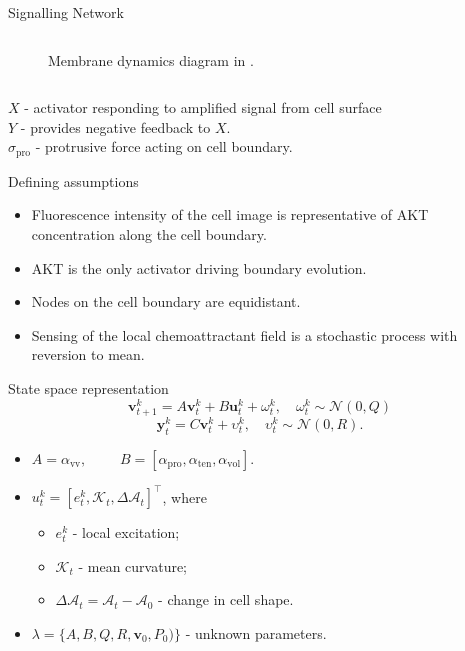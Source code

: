 \documentclass[12pt]{beamer}
\begin{document}
\begin{frame}{Signalling Network}
\begin{columns}
\begin{column}{0.4\textwidth}
\begin{figure}
		\caption{Membrane dynamics diagram in \cite{Endres2017}.} 
	\end{figure}
\end{column}
\end{columns}
	$X$ - activator responding to amplified signal from cell surface \\$Y$ - provides negative feedback to $X$.\\ $\sigma_{\textrm{pro}}$ - protrusive force acting on cell boundary.
\end{frame}

\begin{frame}{Defining assumptions}
\begin{itemize}
	\item Fluorescence intensity of the cell image is representative of AKT concentration along the cell boundary.
	\item AKT is the only activator driving boundary evolution.
	\item Nodes on the cell boundary are equidistant. 
	\item Sensing of the local chemoattractant field is a stochastic process with reversion to mean.
\end{itemize}
\end{frame}

\begin{frame}{State space representation}
\begin{equation*}
\mathbf{v}_{t+1}^{k} = A\mathbf{v}_{t}^{k} + B\mathbf{u}_{t}^{k}+ \omega_{t}^{k}, \quad \omega_{t}^{k} \sim \mathcal{N}(0,Q)
\end{equation*}
\begin{equation*}
\mathbf{y}_{t}^{k} = C \mathbf{v}_{t}^{k} + \upsilon_{t}^{k},\quad \upsilon_{t}^{k} \sim \mathcal{N}(0,R).
\end{equation*}
\begin{itemize}
	\item $A = \alpha_{\textrm{vv}}, \quad$ $\quad B = \left[\alpha_{\textrm{pro}}, \alpha_{\textrm{ten}}, \alpha_{\textrm{vol}}\right]$.
	\item $u_{t}^{k} = \left[ e_{t}^{k}, \mathcal{K}_t, \Delta\mathcal{A}_t \right]^\top$, where
	\begin{itemize}
		\item $e_{t}^{k}$ - local excitation;
		\item $\mathcal{K}_t$ - mean curvature;
		\item $\Delta\mathcal{A}_t = \mathcal{A}_t - \mathcal{A}_0$ - change in cell shape. 
	\end{itemize}
	\item $\lambda = \lbrace A, B, Q, R, \mathbf{v}_0, P_0 ) \rbrace$ - unknown parameters.
\end{itemize}
\end{frame}
\end{document}
